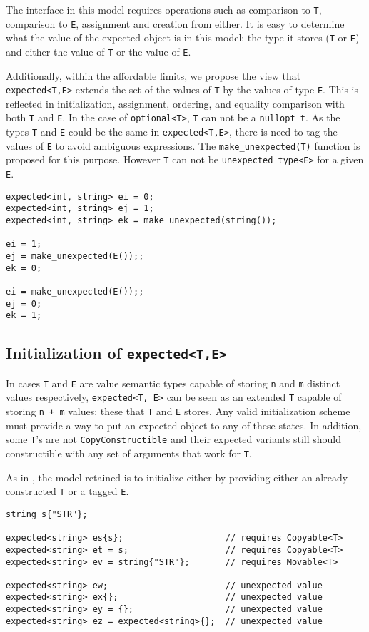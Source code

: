 \documentclass[a4paper,10pt]{article}
\newcommand{\cpp}[1]{\lstinline{#1}}
\begin{document}
The interface in this model requires operations such as comparison to \cpp{T}, comparison to \cpp{E}, assignment and creation from either. It is easy to determine what the value of the expected object is in this model: the type it stores (\cpp{T} or \cpp{E}) and either the value of \cpp{T} or the value of \cpp{E}. 

Additionally, within the affordable limits, we propose the view that \cpp{expected<T,E>} extends the set of the values of \cpp{T} by the values of type \cpp{E}. This is reflected in initialization, assignment, ordering, and equality comparison with both \cpp{T} and \cpp{E}. In the case of  \cpp{optional<T>}, \cpp{T} can not be a \cpp{nullopt_t}. As the types \cpp{T} and \cpp{E} could be the same in \cpp{expected<T,E>}, there is need to tag the values of \cpp{E} to avoid ambiguous expressions. The \cpp{make_unexpected(T)} function is proposed for this purpose. However \cpp{T} can not be  \cpp{unexpected_type<E>} for a given \cpp{E}.

\begin{lstlisting}
expected<int, string> ei = 0;
expected<int, string> ej = 1;
expected<int, string> ek = make_unexpected(string());

ei = 1;
ej = make_unexpected(E());;
ek = 0;

ei = make_unexpected(E());;
ej = 0;
ek = 1;
\end{lstlisting}

\subsection{Initialization of \cpp{expected<T,E>}}

In cases \cpp{T} and \cpp{E} are value semantic types capable of storing \cpp{n} and \cpp{m} distinct values respectively, \cpp{expected<T, E>} can be seen as an extended \cpp{T} capable of storing \cpp{n + m} values: these that \cpp{T} and \cpp{E} stores. Any valid initialization scheme must provide a way to put an expected object to any of these states. In addition, some \cpp{T}'s  are not \cpp{CopyConstructible} and their expected variants still should constructible with any set of arguments that work for \cpp{T}. 

As in \cite{OptionalRev4}, the model retained is to initialize either by providing either an already constructed \cpp{T} or a tagged \cpp{E}.

\begin{lstlisting}
string s{"STR"};

expected<string> es{s};                    // requires Copyable<T>
expected<string> et = s;                   // requires Copyable<T>
expected<string> ev = string{"STR"};       // requires Movable<T>

expected<string> ew;                       // unexpected value
expected<string> ex{};                     // unexpected value
expected<string> ey = {};                  // unexpected value
expected<string> ez = expected<string>{};  // unexpected value
\end{lstlisting}
\end{document}
